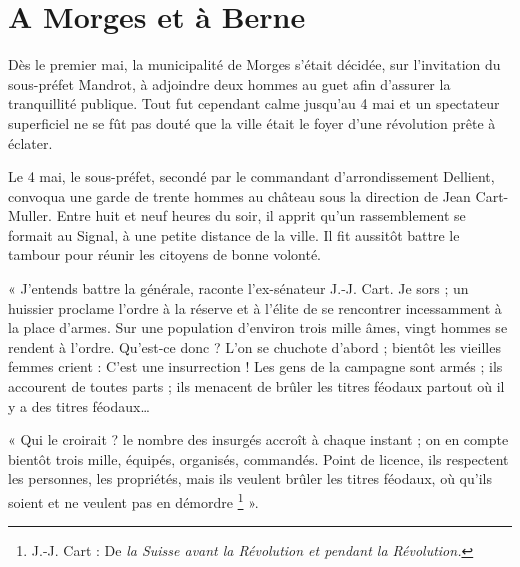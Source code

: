 \documentclass[french,twoside]{book} %
\newenvironment{quoteblock}%
  {\begin{quoting}}
  {\end{quoting}}
\newenvironment{quotebar}{%
    \def\FrameCommand{{\color{rubric!10!}\vrule width 0.5em} \hspace{0.9em}}%
    \def\OuterFrameSep{\itemsep} %
    \MakeFramed {\advance\hsize-\width \FrameRestore}
  }%
  {%
    \endMakeFramed
  }
\renewenvironment{quoteblock}%
  {%
    \savenotes
    \setstretch{0.9}
    \begin{quotebar}
  }
  {%
    \end{quotebar}
    \spewnotes
  }
\begin{document}
\section[A Morges et à Berne]{A Morges et à Berne}
\noindent Dès le premier mai, la municipalité de Morges s’était décidée, sur l’invitation du sous-préfet Mandrot, à adjoindre deux hommes au guet afin d’assurer la tranquillité publique. Tout fut cependant calme jusqu’au 4 mai et un spectateur superficiel ne se fût pas douté que la ville était le foyer d’une révolution prête à éclater.\par
Le 4 mai, le sous-préfet, secondé par le commandant d’arrondissement Dellient, convoqua une garde de trente hommes au château sous la direction de Jean Cart-Muller. Entre huit et neuf heures du soir, il apprit qu’un rassemblement se formait au Signal, à une petite distance de la ville. Il fit aussitôt battre le tambour pour réunir les citoyens de bonne volonté.\par

\begin{quoteblock}
 \noindent « J’entends battre la générale, raconte l’ex-sénateur J.-J. Cart. Je sors ; un huissier proclame l’ordre à la réserve et à l’élite de se rencontrer incessamment à la place d’armes. Sur une population d’environ trois mille âmes, vingt hommes se rendent à l’ordre. Qu’est-ce donc ? L’on se chuchote d’abord ; bientôt les vieilles femmes crient : C’est une insurrection ! Les gens de la campagne sont armés ; ils accourent de toutes parts ; ils menacent de brûler les titres féodaux partout où il y a des titres féodaux…\par
 « Qui le croirait ? le nombre des insurgés accroît à chaque instant ; on en compte bientôt trois mille, équipés, organisés, commandés. Point de licence, ils respectent les personnes, les propriétés, mais ils veulent brûler les titres féodaux, où qu’ils soient et ne veulent pas en démordre \footnote{J.-J. Cart : De \emph{la Suisse avant la Révolution et pendant la Révolution.}} ».
 \end{quoteblock}
\end{document}
